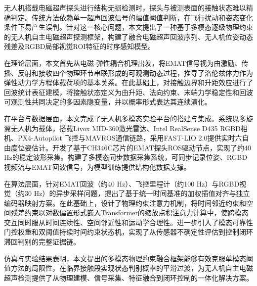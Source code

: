 \begin{chineseabstract}
无人机搭载电磁超声探头进行结构无损检测时，探头与被测表面的接触状态难以精确判定。传统方法依赖单一超声回波信号的幅值阈值判断，在飞行扰动和姿态变化条件下易产生误判。针对这一核心问题，本文提出了一种基于多模态逐级物理约束的无人机自主电磁超声探测框架，构建了融合电磁超声回波序列、无人机位姿动态残差及RGBD局部视觉ROI特征的时序感知模型。

在理论层面，本文首先从电磁-弹性耦合机理出发，将EMAT信号视为由激励、传播、反射和接收四个物理环节串联形成的可观测动态过程，推导了洛伦兹体力作为弹性动力学方程体载荷项的基本关系。在此基础上，对接触边界和升距效应进行了回波统计表征建模，将接触状态定义为由升距、法向约束、末端力学稳定性和回波可观测性共同决定的多因素隐变量，并以概率形式表达其连续演化。

在平台与数据层面，本文完成了无人机多模态实验平台的搭建与集成。系统以多旋翼无人机为载体，搭载Livox MID-360激光雷达、Intel RealSense D435 RGBD相机、PX4-Autopilot 飞控与MAVROS通信链路，采用FAST-LIO 2.0提供实时六自由度位姿估计。开发了基于CH346C芯片的EMAT探头ROS驱动节点，实现了约40 Hz的稳定波形采集。构建了多模态同步数据采集系统，可同步记录位姿、RGBD视频流与EMAT回波信号，为模型训练提供结构化数据支撑。

在算法层面，针对EMAT回波（约40 Hz）、飞控里程计（约100 Hz）与RGBD视觉（约30 Hz）的异步采样问题，提出了基于统一时间基准的加权插值对齐与独立编码器映射方案。在此基础上，设计了物理约束注意力机制，将时间邻近约束和空间残差约束以对数偏置形式嵌入Transformer的缩放点积注意力计算中，使跨模态交互同时服从时间连续性、空间邻近性和运动学合理性。进一步引入了模态可靠性门控权重和双阈值持续时间约束状态机，实现了从传感器不确定性评估到控制闭环滞回判别的完整证据链。

仿真与实验结果表明，本文提出的多模态物理约束融合框架能够有效克服单模态阈值方法的局限性，在临界接触段实现状态判别概率的平滑过渡，为无人机自主电磁超声检测提供了从物理建模、信号采集、特征融合到闭环控制的一体化解决方案。

\end{chineseabstract}

